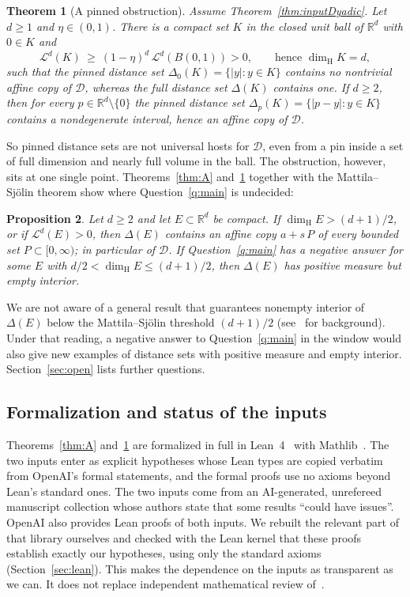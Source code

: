 \documentclass[11pt]{amsart}
\newtheorem{maintheorem}{Theorem}
\newtheorem{mainproposition}[maintheorem]{Proposition}
\theoremstyle{definition}
\theoremstyle{remark}
\newcommand{\R}{\mathbb{R}}
\newcommand{\dimH}{\dim_{\mathrm H}}
\newcommand{\Lm}{\mathcal{L}}
\newcommand{\Dy}{\mathcal{D}}
\begin{document}
\begin{maintheorem}[A pinned obstruction]\label{thm:B}
Assume Theorem~\ref{thm:inputDyadic}. Let $d\ge1$ and $\eta\in(0,1)$. There is a compact set $K$ in the closed
unit ball of $\R^d$ with $0\in K$ and
\[
  \Lm^d(K)\ \ge\ (1-\eta)^d\,\Lm^d(B(0,1))>0,\qquad\text{hence }\dimH K=d,
\]
such that the pinned distance set $\Delta_0(K)=\{|y|:y\in K\}$ contains no nontrivial affine
copy of $\Dy$, whereas the full distance set $\Delta(K)$ contains one.
If $d\ge2$, then for every $p\in\R^d\setminus\{0\}$ the pinned distance set
$\Delta_p(K)=\{|p-y|:y\in K\}$ contains a nondegenerate interval, hence an affine copy of $\Dy$.
\end{maintheorem}

So pinned distance sets are not universal hosts for $\Dy$, even from a pin inside a set of
full dimension and nearly full volume in the ball. The obstruction, however, sits at one single
point. Theorems~\ref{thm:A} and~\ref{thm:B} together with the Mattila--Sj\"olin theorem show
where Question~\ref{q:main} is undecided:

\begin{mainproposition}\label{prop:C}
Let $d\ge2$ and let $E\subset\R^d$ be compact. If $\dimH E>(d+1)/2$, or if $\Lm^d(E)>0$, then
$\Delta(E)$ contains an affine copy $a+s\,P$ of every bounded set $P\subset[0,\infty)$; in
particular of $\Dy$. If Question~\ref{q:main} has a negative answer for some $E$ with
$d/2<\dimH E\le(d+1)/2$, then $\Delta(E)$ has positive measure but empty interior.
\end{mainproposition}

We are not aware of a general result that guarantees nonempty interior of $\Delta(E)$ below the
Mattila--Sj\"olin threshold $(d+1)/2$ (see~\cite{MattilaBook2015} for background). Under that
reading, a negative answer to Question~\ref{q:main} in the window would also give new
examples of distance sets with positive measure and empty interior. Section~\ref{sec:open}
lists further questions.

\subsection{Formalization and status of the inputs}
Theorems~\ref{thm:A} and~\ref{thm:B} are formalized in full in Lean~4~\cite{Lean4}
with Mathlib~\cite{Mathlib2020}. The two inputs enter as explicit hypotheses whose Lean types are
copied verbatim from OpenAI's formal statements, and the formal proofs use no axioms beyond
Lean's standard ones. The two inputs come from an AI-generated, unrefereed manuscript collection
whose authors state that some results ``could have issues''. OpenAI also provides Lean proofs of both
inputs. We rebuilt the relevant part of that library ourselves and checked with the Lean kernel
that these proofs establish exactly our hypotheses, using only the standard axioms
(Section~\ref{sec:lean}). This makes the dependence on the inputs as transparent as we can.
It does not replace independent mathematical review of~\cite{OAIFalconer,OAIDyadic}.
\end{document}
